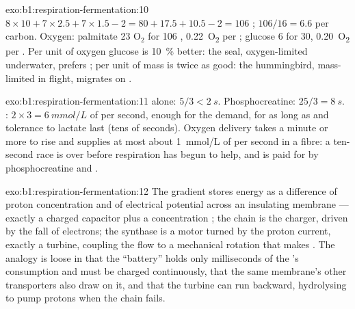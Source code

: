 \begin{solution}{exo:b1:respiration-fermentation:10}
$8\times 10 + 7\times 2.5 + 7\times 1.5 - 2 = 80 + 17.5 + 10.5 - 2 =
106$ ; $106/16 = 6.6$ per carbon. Oxygen: palmitate 23
$\mathrm{O_2}$ for 106 , \qty{0.22}{O_2} per ; glucose 6 for 30,
\qty{0.20}{O_2} per . Per unit of oxygen glucose is \qty{10}{\%}
better: the seal, oxygen-limited underwater, prefers ; per
unit of mass  is twice as good: the hummingbird, mass-limited in
flight, migrates on .
\end{solution}

\begin{solution}{exo:b1:respiration-fermentation:11}
 alone: $5/3 < \qty{2}{s}$. Phosphocreatine: $25/3 = \qty{8}{s}$.
: $2\times 3 = \qty{6}{mmol/L}$ of  per second, enough
for the demand, for as long as  and tolerance to lactate last
(tens of seconds). Oxygen delivery takes a minute or more to rise and
supplies at most about \qty{1}{mmol/L} of  per second in a fibre: a
ten-second race is over before respiration has begun to help, and is
paid for by phosphocreatine and .
\end{solution}

\begin{solution}{exo:b1:respiration-fermentation:12}
The gradient stores energy as a difference of proton concentration and
of electrical potential across an insulating membrane --- exactly a
charged capacitor plus a concentration ; the chain is the charger,
driven by the fall of electrons; the synthase is a motor turned by the
proton current, exactly a turbine, coupling the flow to a mechanical
rotation that makes . The analogy is loose in that the ``battery''
holds only milliseconds of the 's consumption and must be charged
continuously, that the same membrane's other transporters also draw on
it, and that the turbine can run backward, hydrolysing  to pump
protons when the chain fails.
\end{solution}

